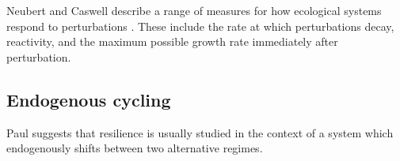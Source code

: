 Neubert and Caswell describe a range of measures for how ecological systems respond to perturbations \cite{neubert_alternatives_1997}. These include the
rate at which perturbations decay, %
reactivity, and the maximum possible growth rate immediately after perturbation.






\subsection{Endogenous cycling}
Paul suggests that resilience is usually studied in the context of a system which endogenously shifts between two alternative regimes.

